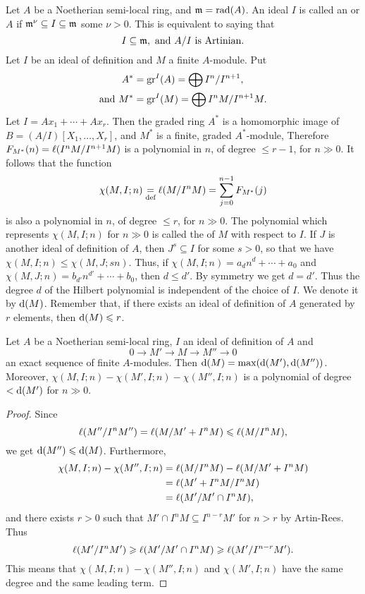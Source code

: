 \documentclass[../main]{subfiles}
\begin{document}
\newparagraph Let $A$ be a Noetherian semi-local ring, and $\mathfrak{m}=\operatorname{rad}(A)$. An ideal $I$ is called an  or $A$ if $\mathfrak{m}^\nu \subseteq I \subseteq \mathfrak{m}$ some $\nu>0$. This is equivalent to saying that \[I \subseteq \mathfrak{m}, \text{ and }A / I\text{ is Artinian}.\] Let $I$ be an ideal of definition and $M$ a finite $A$-module. Put \begin{align*}
    A^*&=\operatorname{gr}^I(A)=\bigoplus I^n / I^{n+1},\\
    \text{and }M^*&=\operatorname{gr}^I(M)=\bigoplus I^n M/I^{n+1} M.
\end{align*}
Let $I=Ax_1+\cdots+Ax_r$. Then the graded ring $A^*$ is a homomorphic image of $B=(A / I)[X_1, \ldots, X_r]$, and $M^*$ is a finite, graded $A^*$-module, Therefore $F_{M^*}(n)=\ell(I^n M / I^{n+1} M)$ is a polynomial in $n$, of degree $\leqslant r-1$, for $n\gg 0$. It follows that the function \[\chi(M, I;n)\underset{\text{def}}{=}\ell(M / I^n M)=\sum_{j=0}^{n-1} F_{M^*}(j)\] is also a polynomial in $n$, of degree $\leqslant r$, for $n \gg 0$. The polynomial which represents $\chi(M, I ; n)$ for $n \gg 0$ is called the  of $M$ with respect to $I$. If $J$ is another ideal of definition of $A$, then $J^s \subseteq I$ for some $s>0$, so that we have $\chi(M, I ; n) \leqslant \chi(M, J ; s n)$. Thus, if $\chi(M, I ; n)=a_dn^d+\cdots+a_0$ and $\chi(M, J ; n)=b_{d'}n^{d'}+\cdots+b_0$, then $d\leqslant d'$. By symmetry we get $d=d'$. Thus the degree $d$ of the Hilbert polynomial is independent of the choice of $I$. We denote it by $\mathrm{d}(M)$. Remember that, if there exists an ideal of definition of $A$ generated by $r$ elements, then $\mathrm{d}(M) \leqslant r$.

\begin{parproposition}
Let $A$ be a Noetherian semi-local ring, $I$ an ideal of definition of $A$ and \[0 \longrightarrow M' \longrightarrow M \longrightarrow M'' \longrightarrow 0\] an exact sequence of finite $A$-modules. Then $\mathrm{d}(M)=\max(\mathrm{d}(M'), \mathrm{d}(M''))$. Moreover, $\chi(M, I ; n)-\chi(M', I ; n)-\chi(M'', I ; n)$ is a polynomial of degree $<\mathrm{d}(M')$ for $n \gg 0$.
\end{parproposition}

\begin{proof}
Since \[\ell(M'' / I^n M'')=\ell(M / M'+I^n M) \leqslant \ell(M / I^n M),\] we get \newline $\mathrm{d}(M'') \leqslant \mathrm{d}(M)$. Furthermore, \[\begin{aligned}\chi(M, I ; n)-\chi(M'', I ; n)&=\ell(M / I^nM)-\ell(M / M'+I^n M)\\&=\ell(M'+I^n M / I^n M)\\&=\ell(M' / M' \cap I^n M),\end{aligned}\] and there exists $r>0$ such that $M' \cap I^n M \subseteq I^{n-r} M'$ for $n>r$ by Artin-Rees. Thus \[\ell(M' / I^n M') \geqslant \ell(M' / M' \cap I^n M) \geqslant \ell(M' / I^{n-r} M').\] This means that $\chi(M, I ; n)-\chi(M'', I ; n)$ and $\chi(M', I ; n)$ have the same degree and the same leading term.
\end{proof}
\end{document}
